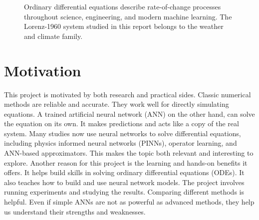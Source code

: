 \begin{figure}[ht]
\centering
{}
\caption{Ordinary differential equations describe rate-of-change processes throughout science, engineering, and modern machine learning. The Lorenz-1960 system studied in this report belongs to the weather and climate family.}
\label{fig:ode_landscape}
\end{figure}

\section{Motivation}
This project is motivated by both research and practical sides. Classic numerical methods are reliable and accurate. They work well for directly simulating equations. A trained artificial neural network (ANN) on the other hand, can solve the equation on its own. It makes predictions and acts like a copy of the real system. Many studies now use neural networks to solve differential equations, including physics informed neural networks (PINNs), operator learning, and ANN-based approximators. This makes the topic both relevant and interesting to explore. Another reason for this project is the learning and hands-on benefits it offers. It helps build skills in solving ordinary differential equations (ODEs). It also teaches how to build and use neural network models. The project involves running experiments and studying the results. Comparing different methods is helpful. Even if simple ANNs are not as powerful as advanced methods, they help us understand their strengths and weaknesses.




